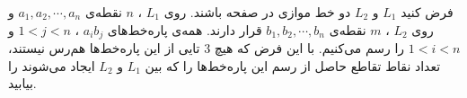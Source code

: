 \EXERCISE
فرض کنید
$L_1$
و
$L_2$
دو خط موازی در صفحه باشند. روی
$L_1$
،
$n$
نقطه‌ی
$a_1, a_2, \cdots, a_n$
و روی
$L_2$
،
$m$
نقطه‌ی
$b_1, b_2, \cdots, b_n$
قرار دارند. همه‌ی پاره‌خط‌های
$a_ib_j$
،
$1 < j < n$
و
$1 < i < n$
را رسم می‌کنیم. با این فرض که هیچ
$3$
تایی از این پاره‌خط‌ها هم‌رس نیستند، تعداد نقاط تقاطع حاصل از رسم این پاره‌خط‌ها را که بین
$L_1$
و
$L_2$
ایجاد می‌شوند را بیابید.